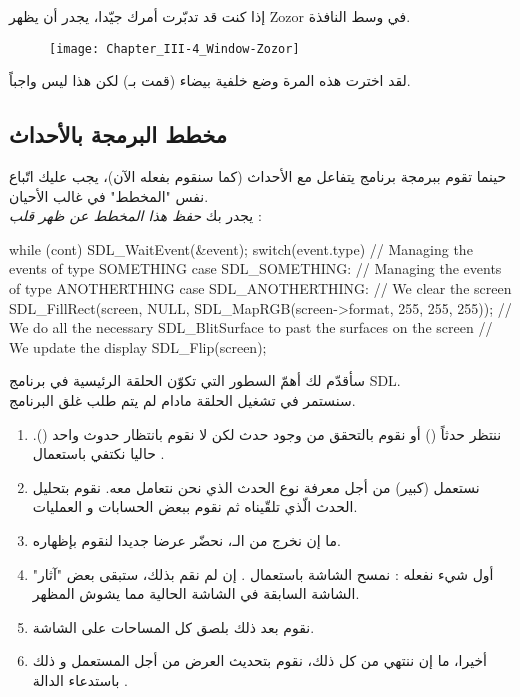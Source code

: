إذا كنت قد تدبّرت أمرك جيّدا، يجدر أن يظهر 
\textenglish{Zozor}
في وسط النافذة.

\begin{figure}[H]
	\centering
	\texttt{[image: Chapter\_III-4\_Window-Zozor]}
\end{figure}

لقد اخترت هذه المرة وضع خلفية بيضاء (قمت بـ)
لكن هذا ليس واجباً.

\subsection{مخطط البرمجة بالأحداث}

حينما تقوم ببرمجة برنامج يتفاعل مع الأحداث (كما سنقوم بفعله الآن)، يجب عليك اتّباع نفس "المخطط" في غالب الأحيان.\\
يجدر بك 
\textit{حفظ هذا المخطط عن ظهر قلب} :

\begin{Csource}
while (cont)
{
	SDL_WaitEvent(&event);
	switch(event.type)
	{
		// Managing the events of type SOMETHING
		case SDL_SOMETHING:
		// Managing the events of type ANOTHERTHING
		case SDL_ANOTHERTHING:
	}
	// We clear the screen
	SDL_FillRect(screen, NULL, SDL_MapRGB(screen->format, 255, 255, 255)); 
	// We do all the necessary SDL_BlitSurface to past the surfaces on the screen
	// We update the display
	SDL_Flip(screen);
}
\end{Csource}

سأقدّم لك أهمّ السطور التي تكوّن الحلقة الرئيسية في برنامج 
\textenglish{SDL}.\\
سنستمر في تشغيل الحلقة مادام لم يتم طلب غلق البرنامج.

\begin{enumerate}
	\item ننتظر حدثاً
	()
	أو نقوم بالتحقق من وجود حدث لكن لا نقوم بانتظار حدوث واحد 
	().
	حاليا نكتفي باستعمال 
	.
	\item نستعمل 
	(كبير) من أجل معرفة نوع الحدث الذي نحن نتعامل معه. نقوم بتحليل الحدث الّذي تلقّيناه ثم نقوم ببعض الحسابات و العمليات.
	\item ما إن نخرج من الـ،
	نحضّر عرضا جديدا لنقوم بإظهاره.
	\item أول شيء نفعله : نمسح الشاشة باستعمال
	.
	إن لم نقم بذلك، ستبقى بعض "آثار" الشاشة السابقة في الشاشة الحالية مما يشوش المظهر.
	\item نقوم بعد ذلك بلصق كل المساحات على الشاشة.
	\item أخيرا، ما إن ننتهي من كل ذلك، نقوم بتحديث العرض من أجل المستعمل و ذلك باستدعاء الدالة
	.
\end{enumerate}

